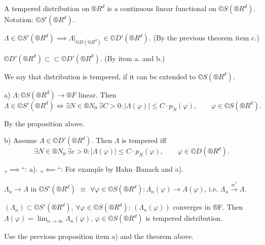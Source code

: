 \documentclass[12pt]{article}					%
\begin{document}
\begin{definice}
	A tempered distribution on $®R^d$ is a continuous linear functional on $©S(®R^d)$. Notation: $©S'(®R^d)$.
\end{definice}

\begin{poznamka}
	$Λ \in ©S'(®R^d) \implies Λ|_{©D(®R^d)} \in ©D'(®R^d)$. (By the previous theorem item c.)

	$©D'(®R^d) \subset \subset ©D'(®R^d)$. (By item a. and b.)

	We say that distribution is tempered, if it can be extended to $©S(®R^d)$.
\end{poznamka}

\begin{tvrzeni}
	a) $Λ: ©S(®R^d) \rightarrow ®F$ linear. Then
	$$ Λ \in ©S'(®R^d) \Leftrightarrow \exists N \in ®N_0\ \exists C > 0: |Λ(φ)| ≤ C·p_N(φ), \qquad φ \in ©S(®R^d). $$

	\begin{dukazin}
		By the proposition above.
	\end{dukazin}

	b) Assume $Λ \in ©D'(®R^d)$. Then $Λ$ is tempered iff
	$$ \exists N \in ®N_0\ \exists c > 0: |Λ(φ)| ≤ C·p_N(φ), \qquad φ \in ©D(®R^d). $$

	\begin{dukazin}
		„$\implies$“: a). „$\impliedby$“: For example by Hahn–Banach and a).
	\end{dukazin}
\end{tvrzeni}

\begin{definice}
	$Λ_n \rightarrow Λ$ in $©S'(®R^d)$ $≡$ $\forall φ \in ©S(®R^d): Λ_n(φ) \rightarrow Λ(φ)$, i.e. $Λ_n \overset{w^*}\rightarrow Λ$.
\end{definice}

\begin{veta}
	$(Λ_n) \subset ©S'(®R^d)$, $\forall φ \in ©S(®R^d)$: $(Λ_n(φ))$ converges in ®F. Then $Λ(φ) = \lim_{n \rightarrow ∞} Λ_n(φ)$, $φ \in ©S(®R^d)$ is tempered distribution.
	
	\begin{dukazin}
		Use the previous proposition item a) and the theorem above.
	\end{dukazin}
\end{veta}
\end{document}
